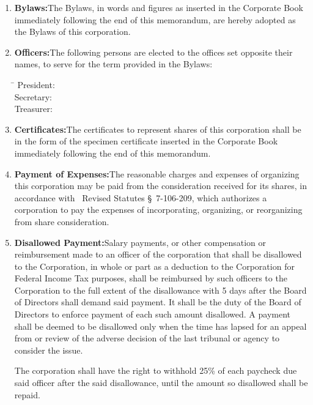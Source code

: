\begin{enumerate}[leftmargin=*, label=\arabic*.]
	\item \textbf{Bylaws:}\enspace The Bylaws, in words and figures as inserted in the Corporate
	Book immediately following the end of this memorandum, are hereby adopted as the Bylaws of
	this corporation.

	\item \textbf{Officers:}\enspace The following persons are elected to the offices set opposite
	their names, to serve for the term provided in the Bylaws:

	\smallskip
	\begin{tabbing}
		\hspace{2.5cm}\=\kill
		President: \> \president \\
		Secretary: \> \secretary \\
		Treasurer: \> \treasurer
	\end{tabbing}

	\item \textbf{Certificates:}\enspace The certificates to represent shares of this corporation
	shall be in the form of the specimen certificate inserted in the Corporate Book immediately
	following the end of this memorandum.

	\item \textbf{Payment of Expenses:}\enspace The reasonable charges and expenses of organizing
	this corporation may be paid from the consideration received for its shares, in accordance with
	\companyState\ Revised Statutes \S~7-106-209, which authorizes a corporation to pay the expenses
	of incorporating, organizing, or reorganizing from share consideration.

	\item \textbf{Disallowed Payment:}\enspace Salary payments, or other compensation or
	reimbursement made to an officer of the corporation that shall be disallowed to the Corporation,
	in whole or part as a deduction to the Corporation for Federal Income Tax purposes, shall be
	reimbursed by such officers to the Corporation to the full extent of the disallowance with 5 days
	after the Board of Directors shall demand said payment. It shall be the duty of the Board of
	Directors to enforce payment of each such amount disallowed. A payment shall be deemed to be
	disallowed only when the time has lapsed for an appeal from or review of the adverse decision of
	the last tribunal or agency to consider the issue.

	\par\medskip
	The corporation shall have the right to withhold 25\% of each paycheck due said officer after the
	said disallowance, until the amount so disallowed shall be repaid.


\end{enumerate}
